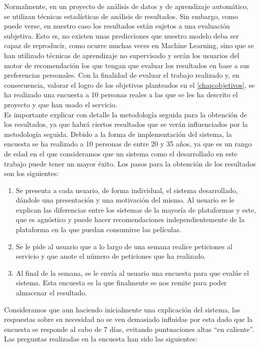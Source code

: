 Normalmente, en un proyecto de análisis de datos y de aprendizaje automático, se utilizan técnicas estadísticas de análisis de resultados. Sin embargo, como puede verse, en nuestro caso los resultados están sujetos a una evaluación subjetiva. Esto es, no existen unas predicciones que nuestro modelo deba ser capaz de reproducir, como ocurre muchas veces en Machine Learning, sino que se han utilizado técnicas de aprendizaje no supervisado y serán los usuarios del motor de recomendación los que tengan que evaluar los resultados en base a sus preferencias personales. Con la finalidad de evaluar el trabajo realizado y, en consecuencia, valorar el logro de los objetivos planteados en el \autoref{chap:objetivos}, se ha realizado una encuesta a 10 personas reales a las que se les ha descrito el proyecto y que han usado el servicio.\\

Es importante explicar con detalle la metodología seguida para la obtención de los resultados, ya que habrá ciertos resultados que se verán influenciados por la metodología seguida. Debido a la forma de implementación del sistema, la encuesta se ha realizado a 10 personas de entre 20 y 35 años, ya que es un rango de edad en el que consideramos que un sistema como el desarrollado en este trabajo puede tener un mayor éxito. Los pasos para la obtención de los resultados son los siguientes:

\begin{enumerate}
    \item Se presenta a cada usuario, de forma individual, el sistema desarrollado, dándole una presentación y una motivación del mismo. Al usuario se le explican las diferencias entre los sistemas de la mayoría de plataformas y este, que es agnóstico y puede hacer recomendaciones independientemente de la plataforma en la que puedan consumirse las películas.
    \item Se le pide al usuario que a lo largo de una semana realice peticiones al servicio y que anote el número de peticiones que ha realizado.
    \item Al final de la semana, se le envía al usuario una encuesta para que evalúe el sistema. Esta encuesta es la que finalmente se nos remite para poder almacenar el resultado.
\end{enumerate}

Consideramos que aun haciendo inicialmente una explicación del sistema, las respuestas sobre su necesidad no se ven demasiado influidas por esta dado que la encuesta se responde al cabo de 7 días, evitando puntuaciones altas ``en caliente''. Las preguntas realizadas en la encuesta han sido las siguientes:

